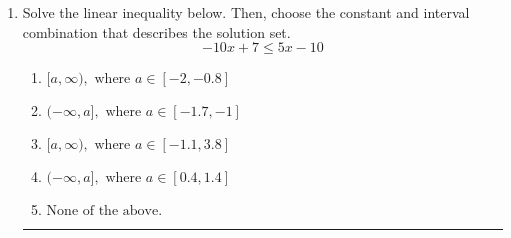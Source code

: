 \documentclass[14pt]{extbook}
\newcommand{\litem}[1]{\item#1\hspace*{-1cm}\rule{\textwidth}{0.4pt}}
\begin{document}
\begin{enumerate}
{\begin{enumerate}[label=\Alph*.]
\end{enumerate} }
\litem{
Solve the linear inequality below. Then, choose the constant and interval combination that describes the solution set.\[ -10x + 7 \leq 5x -10 \]\begin{enumerate}[label=\Alph*.]
\item \( [a, \infty), \text{ where } a \in [-2, -0.8] \)
\item \( (-\infty, a], \text{ where } a \in [-1.7, -1] \)
\item \( [a, \infty), \text{ where } a \in [-1.1, 3.8] \)
\item \( (-\infty, a], \text{ where } a \in [0.4, 1.4] \)
\item \( \text{None of the above}. \)

\end{enumerate} }
\end{enumerate}
\end{document}
